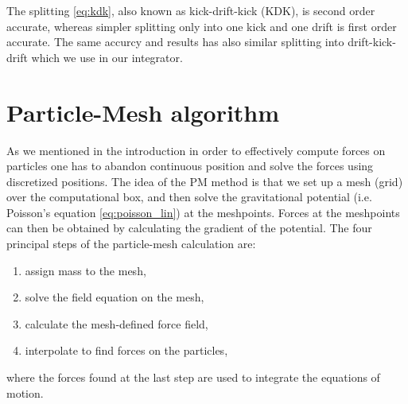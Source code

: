 The splitting \eqref{eq:kdk}, also known as kick-drift-kick (KDK), is second order accurate, whereas simpler splitting only into one kick and one drift is first order accurate. The same accurcy and results has also similar splitting into drift-kick-drift which we use in our integrator.
\section{Particle-Mesh algorithm}
As we mentioned in the introduction in order to effectively compute forces on particles one has to abandon continuous position and solve the forces using discretized positions. The idea of the PM method is that we set up a mesh (grid) over the computational box, and then solve the gravitational potential (i.e. Poisson’s equation \eqref{eq:poisson_lin}) at the meshpoints. Forces at the meshpoints can then be obtained by calculating the gradient of the potential. The four principal steps of the particle-mesh calculation are:
\begin{enumerate}
    \item assign mass to the mesh,
    \label{it:pm_1}
    \item solve the field equation on the mesh,
    \label{it:pm_2}
    \item calculate the mesh-defined force field,
    \label{it:pm_3}
    \item interpolate to find forces on the particles,
    \label{it:pm_4}
\end{enumerate}
where the forces found at the last step are used to integrate the equations of motion.

